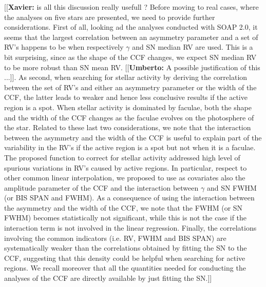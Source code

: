 \documentclass{aa}
\newcommand{\xavier}[1]{{\color{blue}[[\textbf{Xavier: }#1]]}}
\newcommand{\umberto}[1]{{\color{green}[[\textbf{Umberto: }#1]]}}
\begin{document}
\xavier{is all this discussion really usefull ? Before moving to real cases, where the analyses on five stars are presented, we need to provide further considerations. First of all, looking ad the analyses conducted with SOAP 2.0, it seems that the largest correlation between an asymmetry parameter and a set of RV's happens to be when respectively $\gamma$ and SN median RV are used. This is a bit surprising, since as the shape of the CCF changes, we expect SN median RV to be more robust than SN mean RV. \umberto{A possible justification of this ...}. As second, when searching for stellar activity by deriving the correlation between the set of RV's and either an asymmetry parameter or the width of the CCF, the latter leads to weaker and hence less conclusive results if the active region is a spot. When stellar activity is dominated by faculae, both the shape and the width of the CCF changes as the faculae evolves on the photosphere of the star. Related to these last two considerations, we note that the interaction between the asymmetry and the width of the CCF is useful to explain part of the variability in the RV's if the active region is a spot but not when it is a faculae. The proposed function to correct for stellar activity addressed high level of spurious variations in RV's caused by active regions. In particular, respect to other common linear interpolation, we proposed to use as covariates also the amplitude parameter of the CCF and the interaction between $\gamma$ and SN FWHM (or BIS SPAN and FWHM). As a consequence of using the interaction between the asymmetry and the width of the CCF, we note that the FWHM (or SN FWHM) becomes statistically not significant, while this is not the case if the interaction term is not involved in the linear regression. Finally, the correlations involving the common indicators (i.e. RV, FWHM and BIS SPAN) are systematically weaker than the correlations obtained by fitting the SN to the CCF, suggesting that this density could be helpful when searching for active regions. We recall moreover that all the quantities needed for conducting the analyses of the CCF are directly available by just fitting the SN.}

\end{document}
